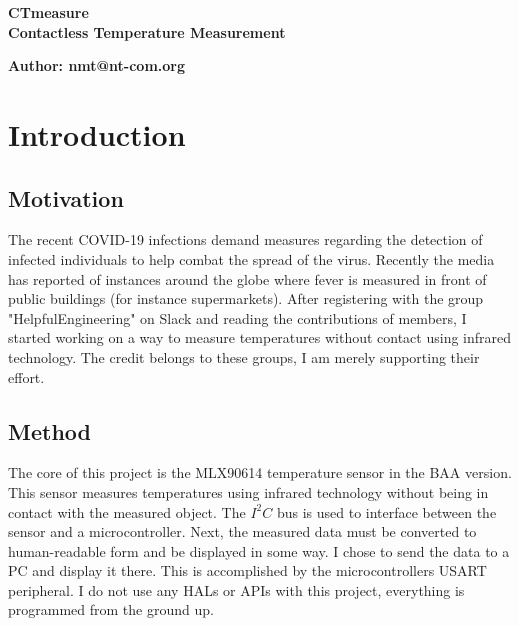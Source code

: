 \documentclass{article}[12pt]
\begin{document}
 \setlength\parindent{0pt}

\begin{center}
\huge{\textbf{CTmeasure\\Contactless Temperature Measurement}}
\end{center}

\begin{center}
\textbf{Author: nmt@nt-com.org}
\end{center}


\section{Introduction}

\subsection{Motivation}

The recent COVID-19 infections demand measures regarding the detection of infected individuals to help combat the spread of the virus. Recently the media has reported of instances around the globe where fever is measured in front of public buildings (for instance supermarkets). After registering with the group "HelpfulEngineering" on Slack and reading the contributions of members, I started working on a way to measure temperatures without contact using infrared technology. The credit belongs to these groups, I am merely supporting their effort.

\subsection{Method}

The core of this project is the MLX90614 temperature sensor in the BAA version. This sensor measures temperatures using infrared technology without being in contact with the measured object. The $I^2C$ bus is used to interface between the sensor and a microcontroller. Next, the measured data must be converted to human-readable form and be displayed in some way. I chose to send the data to a PC and display it there. This is accomplished by the microcontrollers USART peripheral. I do not use any HALs or APIs with this project, everything is programmed from the ground up.
\end{document}
